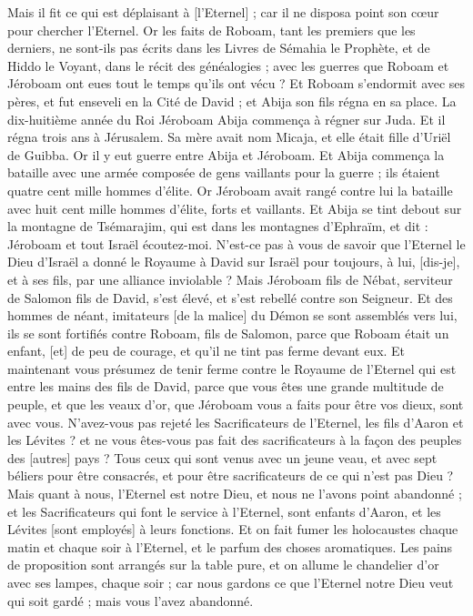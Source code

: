 \begin{multicols}{2}
Mais il fit ce qui est déplaisant à [l'Eternel] ; car il ne disposa point son cœur pour chercher l'Eternel.
Or les faits de Roboam, tant les premiers que les derniers, ne sont-ils pas écrits dans les Livres de Sémahia le Prophète, et de Hiddo le Voyant, dans le récit des généalogies ; avec les guerres que Roboam et Jéroboam ont eues tout le temps qu'ils ont vécu ?
Et Roboam s'endormit avec ses pères, et fut enseveli en la Cité de David ; et Abija son fils régna en sa place.
\VerseOne{}La dix-huitième année du Roi Jéroboam Abija commença à régner sur Juda.
Et il régna trois ans à Jérusalem. Sa mère avait nom Micaja, et elle était fille d'Uriël de Guibba. Or il y eut guerre entre Abija et Jéroboam.
Et Abija commença la bataille avec une armée composée de gens vaillants pour la guerre ; ils étaient quatre cent mille hommes d'élite. Or Jéroboam avait rangé contre lui la bataille avec huit cent mille hommes d'élite, forts et vaillants.
Et Abija se tint debout sur la montagne de Tsémarajim, qui est dans les montagnes d'Ephraïm, et dit : Jéroboam et tout Israël écoutez-moi.
N'est-ce pas à vous de savoir que l'Eternel le Dieu d'Israël a donné le Royaume à David sur Israël pour toujours, à lui, [dis-je], et à ses fils, par une alliance inviolable ?
Mais Jéroboam fils de Nébat, serviteur de Salomon fils de David, s'est élevé, et s'est rebellé contre son Seigneur.
Et des hommes de néant, imitateurs [de la malice] du Démon se sont assemblés vers lui, ils se sont fortifiés contre Roboam, fils de Salomon, parce que Roboam était un enfant, [et] de peu de courage, et qu'il ne tint pas ferme devant eux.
Et maintenant vous présumez de tenir ferme contre le Royaume de l'Eternel qui est entre les mains des fils de David, parce que vous êtes une grande multitude de peuple, et que les veaux d'or, que Jéroboam vous a faits pour être vos dieux, sont avec vous.
N'avez-vous pas rejeté les Sacrificateurs de l'Eternel, les fils d'Aaron et les Lévites ? et ne vous êtes-vous pas fait des sacrificateurs à la façon des peuples des [autres] pays ? Tous ceux qui sont venus avec un jeune veau, et avec sept béliers pour être consacrés, et pour être sacrificateurs de ce qui n'est pas Dieu ?
Mais quant à nous, l'Eternel est notre Dieu, et nous ne l'avons point abandonné ; et les Sacrificateurs qui font le service à l'Eternel, sont enfants d'Aaron, et les Lévites [sont employés] à leurs fonctions.
Et on fait fumer les holocaustes chaque matin et chaque soir à l'Eternel, et le parfum des choses aromatiques. Les pains de proposition sont arrangés sur la table pure, et on allume le chandelier d'or avec ses lampes, chaque soir ; car nous gardons ce que l'Eternel notre Dieu veut qui soit gardé ; mais vous l'avez abandonné.

\end{multicols}
